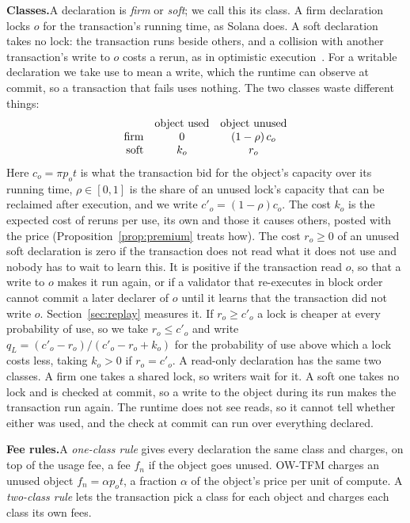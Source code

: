 \documentclass[conference,compsoc]{IEEEtran}
\numberwithin{equation}{section}
\theoremstyle{plain}
\theoremstyle{definition}
\theoremstyle{remark}
\newcommand{\runin}[1]{\par\smallskip\noindent\textbf{#1.}\enspace}
\newcommand{\cp}{c'}
\newcommand{\qL}{q_L}
\begin{document}
\runin{Classes}A declaration is \emph{firm} or \emph{soft}; we call this its class. A firm declaration locks $o$ for the transaction's running time, as Solana does. A soft declaration takes no lock: the transaction runs beside others, and a collision with another transaction's write to $o$ costs a rerun, as in optimistic execution~\cite{gelashvili2023blockstm}. For a writable declaration we take use to mean a write, which the runtime can observe at commit, so a transaction that fails uses nothing. The two classes waste different things:
\begin{equation*}
\begin{array}{r@{\quad}c@{\quad}c}
 & \text{object used} & \text{object unused}\\
\text{firm} & 0 & (1-\rho)\,c_o\\
\text{soft} & k_o & r_o
\end{array}
\end{equation*}
Here $c_o = \pi p_o t$ is what the transaction bid for the object's capacity over its running time, $\rho \in [0,1]$ is the share of an unused lock's capacity that can be reclaimed after execution, and we write $\cp_o = (1-\rho) c_o$. The cost $k_o$ is the expected cost of reruns per use, its own and those it causes others, posted with the price (Proposition~\ref{prop:premium} treats how). The cost $r_o \ge 0$ of an unused soft declaration is zero if the transaction does not read what it does not use and nobody has to wait to learn this. It is positive if the transaction read $o$, so that a write to $o$ makes it run again, or if a validator that re-executes in block order cannot commit a later declarer of $o$ until it learns that the transaction did not write $o$. Section~\ref{sec:replay} measures it. If $r_o \ge \cp_o$ a lock is cheaper at every probability of use, so we take $r_o \le \cp_o$ and write $\qL = (\cp_o - r_o)/(\cp_o - r_o + k_o)$ for the probability of use above which a lock costs less, taking $k_o > 0$ if $r_o = \cp_o$. A read-only declaration has the same two classes. A firm one takes a shared lock, so writers wait for it. A soft one takes no lock and is checked at commit, so a write to the object during its run makes the transaction run again. The runtime does not see reads, so it cannot tell whether either was used, and the check at commit can run over everything declared.

\runin{Fee rules}A \emph{one-class rule} gives every declaration the same class and charges, on top of the usage fee, a fee $f_n$ if the object goes unused. OW-TFM charges an unused object $f_n = \alpha p_o t$, a fraction $\alpha$ of the object's price per unit of compute. A \emph{two-class rule} lets the transaction pick a class for each object and charges each class its own fees.
\end{document}
